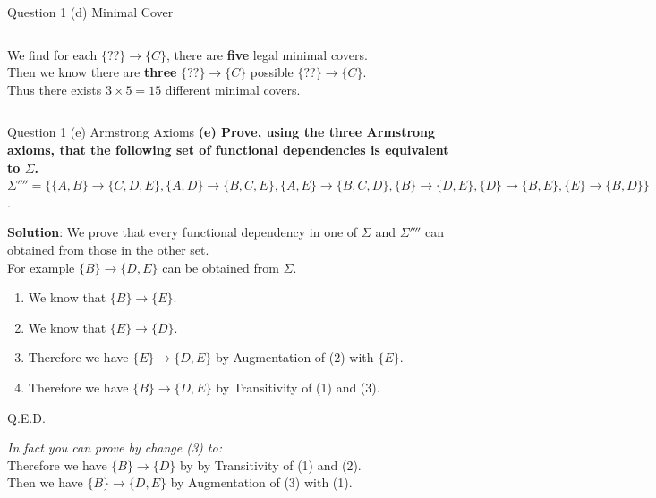 \begin{frame}[fragile]{Question 1 (d) Minimal Cover}
\begin{columns}[t]
	{\small
	We find for each $\{??\} \rightarrow \{C\}$, there are \textbf{five} legal minimal covers. \\\vspace{2pt}
	Then we know there are \textbf{three} $\{??\} \rightarrow \{C\}$ possible $\{??\} \rightarrow \{C\}$.\\\vspace{2pt}
	Thus there exists $3\times 5=15$ different minimal covers. 
	}
\end{columns}
\end{frame}

\begin{frame}[fragile]{Question 1 (e) Armstrong Axioms}
	\textbf{(e) Prove, using the three Armstrong axioms, that the following set of functional dependencies is equivalent to $\Sigma$.} \\\vspace{5pt}
	$\Sigma''''=\{\{A, B\} \rightarrow \{C, D, E\}, \{A, D\} \rightarrow \{B, C, E\}, \{A, E\} \rightarrow \{B, C, D\}, \{B\} \rightarrow \{D, E\}, \{D\} \rightarrow \{B, E\}, \{E\} \rightarrow \{B, D\}\}$.\\\vspace{5pt}
	
	\textbf{Solution}: We prove that every functional dependency in one of $\Sigma$ and $\Sigma''''$ can obtained from those in the other set.\\\vspace{2pt}
	For example $\{B\} \rightarrow \{D,E\}$ can be obtained from $\Sigma$.
	
	\begin{enumerate}
		\item We know that $\{B\} \rightarrow \{E\}$.
		\item We know that $\{E\} \rightarrow \{D\}$.
		\item Therefore we have $\{E\} \rightarrow \{D, E\}$ by Augmentation of (2) with $\{E\}$.
		\item Therefore we have $\{B\} \rightarrow \{D, E\}$ by Transitivity of (1) and (3).
	\end{enumerate}

	Q.E.D.\\\vspace{7pt}
	
	\textit{In fact you can prove by change (3) to:}\\
	Therefore we have $\{B\} \rightarrow \{D\}$ by by Transitivity of (1) and (2).\\ 
	Then we have $\{B\} \rightarrow \{D, E\}$ by Augmentation of (3) with (1).
\end{frame}


